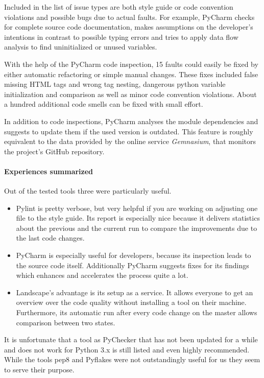 Included in the list of issue types are both style guide or code convention violations and possible bugs due to actual faults.
For example, PyCharm checks for complete source code documentation, makes assumptions on the developer's intentions in contrast to possible typing errors and tries to apply data flow analysis to find uninitialized or unused variables.

With the help of the PyCharm code inspection, 15 faults could easily be fixed by either automatic refactoring or simple manual changes.
These fixes included false missing HTML tags and wrong tag nesting, dangerous python variable initialization and comparison as well as minor code convention violations.
About a hundred additional code smells can be fixed with small effort.

In addition to code inspections, PyCharm analyses the module dependencies and suggests to update them if the used version is outdated.
This feature is roughly equivalent to the data provided by the online service \textit{Gemnasium}, that monitors the project's GitHub repository.

\paragraph{Experiences summarized}
Out of the tested tools three were particularly useful.

\begin{itemize}
    \item Pylint is pretty verbose, but very helpful if you are working on adjusting one file to the style guide.
    Its report is especially nice because it delivers statistics about the previous and the current run to compare the improvements due to the last code changes.
    \item PyCharm is especially useful for developers, because its inspection leads to the source code itself.
    Additionally PyCharm suggests fixes for its findings which enhances and accelerates the process quite a lot.
    \item Landscape's advantage is its setup as a service. It allows everyone to get an overview over the code quality without installing a tool on their machine. Furthermore, its automatic run after every code change on the master allows comparison between two states.
\end{itemize}

It is unfortunate that a tool as PyChecker that has not been updated for a while and does not work for Python 3.x is still listed and even highly recommended.  
While the tools pep8 and Pyflakes were not outstandingly useful for us they seem to serve their purpose.

